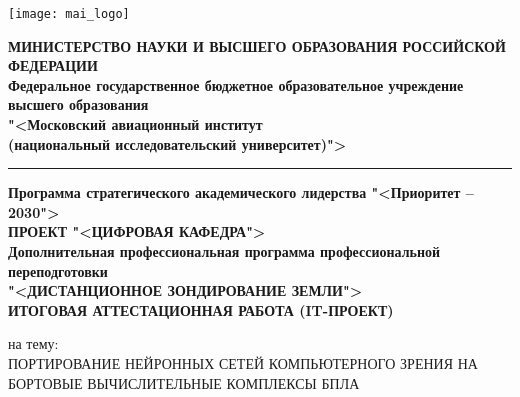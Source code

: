 \thispagestyle{empty}

\begin{center}

    \noindent
    \begin{minipage}{0.15\textwidth}
        \texttt{[image: mai\_logo]}
    \end{minipage}%
    \hfill
    \begin{minipage}{0.6\textwidth}\centering
        \textbf{МИНИСТЕРСТВО НАУКИ И ВЫСШЕГО ОБРАЗОВАНИЯ РОССИЙСКОЙ ФЕДЕРАЦИИ \\
        Федеральное государственное бюджетное образовательное учреждение высшего образования \\
        "<Московский авиационный институт \\
        (национальный исследовательский университет)">}
    \end{minipage}

    \vspace{3.0pt}
    \noindent\rule{\textwidth}{2pt}
    \vspace{3.0pt}

    \textbf{{\fontsize{12}{12}\selectfont
        Программа стратегического академического лидерства "<Приоритет – 2030">
    }} \\
    \vspace{2.0pt}
    \textbf{{\fontsize{12}{12}\selectfont
        ПРОЕКТ "<ЦИФРОВАЯ КАФЕДРА">
    }} \\
    \vspace{5.0pt}
    \textbf{{\fontsize{12}{12}\selectfont
        Дополнительная профессиональная программа профессиональной переподготовки
    }} \\
    \textbf{{\fontsize{12}{12}\selectfont
        "<ДИСТАНЦИОННОЕ ЗОНДИРОВАНИЕ ЗЕМЛИ">
    }} \\
    \vspace{5.0pt}
    \textbf{{\fontsize{16}{16}\selectfont
        ИТОГОВАЯ АТТЕСТАЦИОННАЯ РАБОТА (IT-ПРОЕКТ)
    }}

\end{center}


\begin{center}

    на тему: \\
    \uppercase{Портирование нейронных сетей компьютерного зрения на бортовые вычислительные комплексы БПЛА}
    
\end{center}

\vfill

